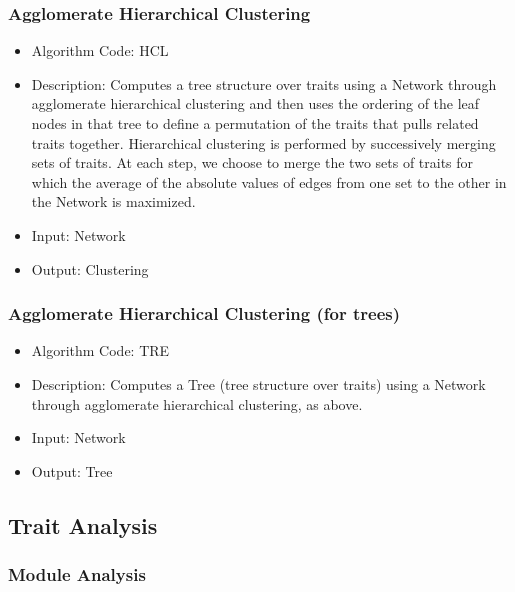 \documentclass{article}
\begin{document}
\subsubsection{Agglomerate Hierarchical Clustering}

\begin{itemize}
\item Algorithm Code: HCL
\item Description: Computes a tree structure over traits using a Network through agglomerate hierarchical clustering and then uses the ordering of the leaf nodes in that tree to define a permutation of the traits that pulls related traits together. Hierarchical clustering is performed by successively merging sets of traits. At each step, we choose to merge the two sets of traits for which the average of the absolute values of edges from one set to the other in the Network is maximized.
\item Input: Network
\item Output: Clustering
\end{itemize}

\subsubsection{Agglomerate Hierarchical Clustering (for trees)}

\begin{itemize}
\item Algorithm Code: TRE
\item Description: Computes a Tree (tree structure over traits) using a Network through agglomerate hierarchical clustering, as above.
\item Input: Network
\item Output: Tree
\end{itemize}

\subsection{Trait Analysis}
\subsubsection{Module Analysis}
\end{document}
